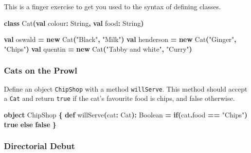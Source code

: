 \documentclass[11pt,a5paper,]{book}
\newenvironment{Shaded}{\begin{snugshade}}{\end{snugshade}}
\newcommand{\ControlFlowTok}[1]{\textcolor[rgb]{0.13,0.29,0.53}{\textbf{#1}}}
\newcommand{\ExtensionTok}[1]{#1}
\newcommand{\FunctionTok}[1]{\textcolor[rgb]{0.00,0.00,0.00}{#1}}
\newcommand{\KeywordTok}[1]{\textcolor[rgb]{0.13,0.29,0.53}{\textbf{#1}}}
\newcommand{\NormalTok}[1]{#1}
\newcommand{\OperatorTok}[1]{\textcolor[rgb]{0.81,0.36,0.00}{\textbf{#1}}}
\newcommand{\StringTok}[1]{\textcolor[rgb]{0.31,0.60,0.02}{#1}}
\begin{document}
This is a finger exercise to get you used to the syntax of defining
classes.

\begin{Shaded}
\begin{Highlighting}[]
\KeywordTok{class} \FunctionTok{Cat}\OperatorTok{(}\KeywordTok{val}\NormalTok{ colour}\OperatorTok{:} \ExtensionTok{String}\OperatorTok{,} \KeywordTok{val}\NormalTok{ food}\OperatorTok{:} \ExtensionTok{String}\OperatorTok{)}

\KeywordTok{val}\NormalTok{ oswald }\OperatorTok{=} \KeywordTok{new} \FunctionTok{Cat}\OperatorTok{(}\StringTok{"Black"}\OperatorTok{,} \StringTok{"Milk"}\OperatorTok{)}
\KeywordTok{val}\NormalTok{ henderson }\OperatorTok{=} \KeywordTok{new} \FunctionTok{Cat}\OperatorTok{(}\StringTok{"Ginger"}\OperatorTok{,} \StringTok{"Chips"}\OperatorTok{)}
\KeywordTok{val}\NormalTok{ quentin }\OperatorTok{=} \KeywordTok{new} \FunctionTok{Cat}\OperatorTok{(}\StringTok{"Tabby and white"}\OperatorTok{,} \StringTok{"Curry"}\OperatorTok{)}
\end{Highlighting}
\end{Shaded}

\hypertarget{cats-on-the-prowl}{%
\subsubsection{Cats on the Prowl}\label{cats-on-the-prowl}}

Define an object \texttt{ChipShop} with a method \texttt{willServe}.
This method should accept a \texttt{Cat} and return \texttt{true} if the
cat's favourite food is chips, and false otherwise.

\begin{Shaded}
\begin{Highlighting}[]
\KeywordTok{object}\NormalTok{ ChipShop }\OperatorTok{\{}
  \KeywordTok{def} \FunctionTok{willServe}\OperatorTok{(}\NormalTok{cat}\OperatorTok{:}\NormalTok{ Cat}\OperatorTok{):} \ExtensionTok{Boolean} \OperatorTok{=}
    \ControlFlowTok{if}\OperatorTok{(}\NormalTok{cat}\OperatorTok{.}\NormalTok{food }\OperatorTok{==} \StringTok{"Chips"}\OperatorTok{)}
      \KeywordTok{true}
    \ControlFlowTok{else}
      \KeywordTok{false}
\OperatorTok{\}}
\end{Highlighting}
\end{Shaded}

\hypertarget{directorial-debut}{%
\subsubsection{Directorial Debut}\label{directorial-debut}}
\end{document}
